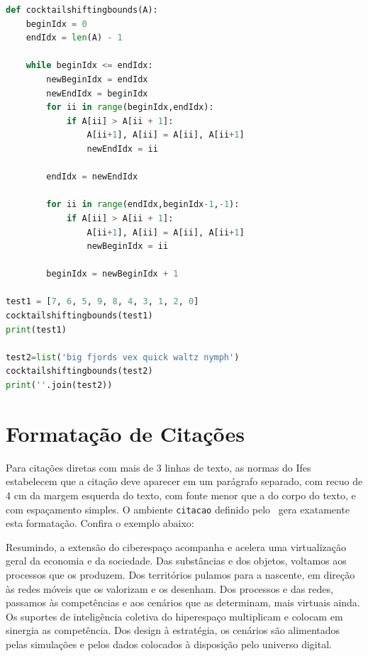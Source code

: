 \documentclass[times,english,brazilian,oneside,section=TITLE]{ifes8}
\begin{document}
\begin{lstlisting}[language=Python,float,label=lst:cocktailsort,caption={Algoritmo de
ordenação \emph{Cocktail sort} com limites deslocáveis.}]
def cocktailshiftingbounds(A):
    beginIdx = 0
    endIdx = len(A) - 1
 
    while beginIdx <= endIdx:
        newBeginIdx = endIdx
        newEndIdx = beginIdx
        for ii in range(beginIdx,endIdx):
            if A[ii] > A[ii + 1]:
                A[ii+1], A[ii] = A[ii], A[ii+1]
                newEndIdx = ii
 
        endIdx = newEndIdx
 
        for ii in range(endIdx,beginIdx-1,-1):
            if A[ii] > A[ii + 1]:
                A[ii+1], A[ii] = A[ii], A[ii+1]
                newBeginIdx = ii
 
        beginIdx = newBeginIdx + 1
 
test1 = [7, 6, 5, 9, 8, 4, 3, 1, 2, 0]
cocktailshiftingbounds(test1)
print(test1)
 
test2=list('big fjords vex quick waltz nymph')
cocktailshiftingbounds(test2)
print(''.join(test2))
\end{lstlisting}

\section{Formatação de Citações}
\label{sec:format-citac}

Para citações diretas com mais de 3 linhas de texto, as normas do Ifes
estabelecem que a citação deve aparecer em um parágrafo separado, com
recuo de 4 cm da margem esquerda do texto, com fonte menor que a do
corpo do texto, e com espaçamento simples. O ambiente \texttt{citacao}
definido pelo \abnTeX\ gera exatamente esta formatação. Confira o
exemplo abaixo:

\begin{citacao}
  Resumindo, a extensão do ciberespaço acompanha e acelera uma
  virtualização geral da economia e da sociedade. Das substâncias e
  dos objetos, voltamos aos processos que os produzem. Dos territórios
  pulamos para a nascente, em direção às redes móveis que os valorizam
  e os desenham. Dos processos e das redes, passamos às competências e
  aos cenários que as determinam, mais virtuais ainda. Os suportes de
  inteligência coletiva do hiperespaço multiplicam e colocam em
  sinergia as competência. Dos design à estratégia, os cenários são
  alimentados pelas simulações e pelos dados colocados à disposição
  pelo universo digital. \cite{Levy1999}
\end{citacao}
\end{document}
